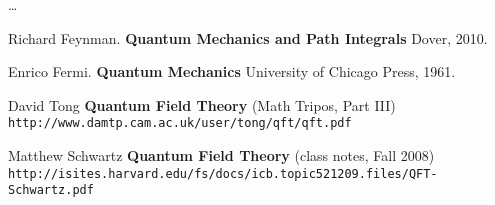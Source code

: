 \documentclass[12pt]{article}
\begin{document}
\newpage

\noindent \dots 

\vfill

\begin{thebibliography}{}

\item Richard Feynman.  \textbf{Quantum Mechanics and Path Integrals} Dover, 2010.

\item Enrico Fermi.  \textbf{Quantum Mechanics} University of Chicago Press, 1961.

\item David Tong \textbf{Quantum Field Theory} (Math Tripos, Part III)  \\ \texttt{http://www.damtp.cam.ac.uk/user/tong/qft/qft.pdf}

\item Matthew Schwartz \textbf{Quantum Field Theory} (class notes, Fall 2008) \\
\texttt{http://isites.harvard.edu/fs/docs/icb.topic521209.files/QFT-Schwartz.pdf}

\end{thebibliography}
\end{document}
